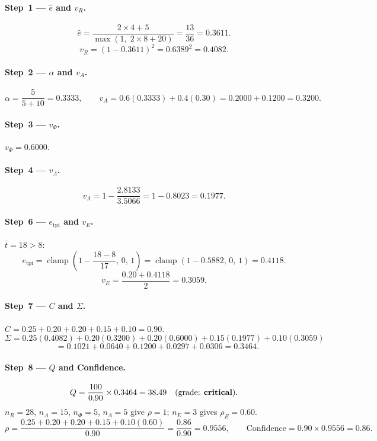 \documentclass[11pt,a4paper]{article}
\newcommand{\clamp}[3]{\operatorname{clamp}\!\left(#1,\,#2,\,#3\right)}
\begin{document}
\paragraph{Step~1 --- $\hat{e}$ and $v_R$.}
\[
  \hat{e} = \frac{2\times4+5}{\max(1,\;2\times8+20)} = \frac{13}{36} = 0.3611.
\]
\[
  v_R = (1-0.3611)^2 = 0.6389^2 = 0.4082.
\]

\paragraph{Step~2 --- $\alpha$ and $v_A$.}
\[
  \alpha = \frac{5}{5+10} = 0.3333, \qquad
  v_A = 0.6(0.3333)+0.4(0.30) = 0.2000+0.1200 = 0.3200.
\]

\paragraph{Step~3 --- $v_\Phi$.} $v_\Phi = 0.6000$.

\paragraph{Step~4 --- $v_\Lambda$.}
\[
  v_\Lambda = 1 - \frac{2.8133}{3.5066} = 1 - 0.8023 = 0.1977.
\]

\paragraph{Step~6 --- $e_{\mathrm{tpi}}$ and $v_E$.}
$\bar{t}=18>8$:
\[
  e_{\mathrm{tpi}} = \clamp{1-\frac{18-8}{17}}{0}{1}
                  = \clamp{1-0.5882}{0}{1} = 0.4118.
\]
\[
  v_E = \frac{0.20+0.4118}{2} = 0.3059.
\]

\paragraph{Step~7 --- $C$ and $\Sigma$.}
$C = 0.25+0.20+0.20+0.15+0.10 = 0.90$.
\[
  \Sigma = 0.25(0.4082)+0.20(0.3200)+0.20(0.6000)+0.15(0.1977)+0.10(0.3059)
\]
\[
  \phantom{\Sigma}= 0.1021+0.0640+0.1200+0.0297+0.0306 = 0.3464.
\]

\paragraph{Step~8 --- $Q$ and Confidence.}
\[
  Q = \frac{100}{0.90}\times0.3464 = 38.49 \quad (\text{grade: \textbf{critical}}).
\]
$n_R=28$, $n_A=15$, $n_\Phi=5$, $n_\Lambda=5$ give $\rho=1$;
$n_E=3$ gives $\rho_E=0.60$.
\[
  \rho = \frac{0.25+0.20+0.20+0.15+0.10(0.60)}{0.90}
       = \frac{0.86}{0.90} = 0.9556,
  \qquad \text{Confidence} = 0.90\times0.9556 = 0.86.
\]
\end{document}
